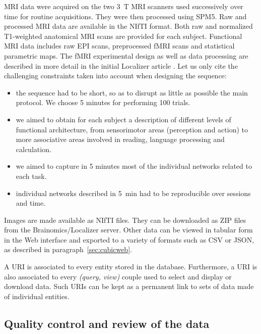 \documentclass[review]{elsarticle}
\begin{document}
MRI data were acquired on the two 3~T MRI scanners used successively over time for routine acquisitions. They were then processed using SPM5. Raw and processed MRI data are available in the NIfTI format. Both raw and normalized T1-weighted anatomical MRI scans are provided for each subject. Functional MRI data includes raw EPI scans, preprocessed fMRI scans and statistical parametric maps. The fMRI experimental design as well as data processing are described in more detail in the initial Localizer article \cite{Pinel2007}. Let us only cite the challenging constraints taken into account when designing the sequence:
\begin{itemize}
\item the sequence had to be short, so as to disrupt as little as possible the main protocol. We choose 5 minutes for performing 100 trials.
\item we aimed to obtain for each subject a description of different levels of functional architecture, from sensorimotor areas (perception and action) to more associative areas involved in reading, language processing and calculation.
\item we aimed to capture in 5 minutes most of the individual networks related to each task.
\item individual networks described in 5~min had to be reproducible over sessions and time.
\end{itemize}

Images are made available as NIfTI files. They can be downloaded as ZIP files from the Brainomics/Localizer server. Other data can be viewed in tabular form in the Web interface and exported to a variety of formats such as CSV or JSON, as described in paragraph~\ref{sec:cubicweb}.

A URI is associated to every entity stored in the database. Furthermore, a URI is also associated to every \emph{(query, view)} couple used to select and display or download data. Such URIs can be kept as a permanent link to sets of data made of individual entities.

\begin{footnotesize}
\label{code:nilearn}
\end{footnotesize}


\subsection{Quality control and review of the data}
\end{document}

